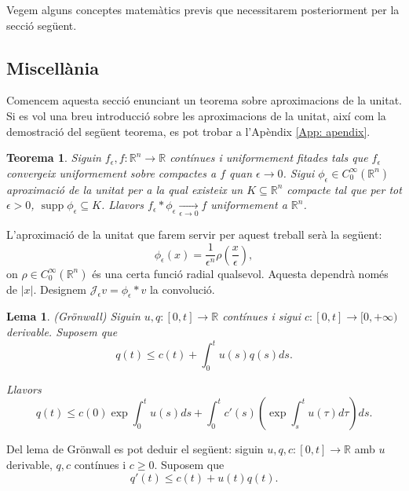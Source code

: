 \documentclass{article}
\numberwithin{equation}{section}
\DeclareMathOperator{\supp}{supp}
\newtheorem{teorema}{Teorema}[section]
\newtheorem{lema}{Lema}[section]
\begin{document}
Vegem alguns conceptes matem\`{a}tics previs que necessitarem posteriorment per la secci\'{o} seg\"{u}ent.

\subsection{Miscel\textperiodcentered l\`{a}nia}\label{Sse: miscellania}

Comencem aquesta secci\'{o} enunciant un teorema sobre aproximacions de la unitat. Si es vol una breu introducci\'{o} sobre les aproximacions de la unitat, aix\'{i} com la demostraci\'{o} del seg\"{u}ent teorema, es pot trobar a l'Ap\`{e}ndix \ref{App: apendix}.

\begin{teorema}\label{Teo: successio suavitzada}
Siguin $f_{\epsilon},f:\mathbb{R}^n\rightarrow\mathbb{R}$ cont\'{i}nues i uniformement fitades tals que $f_{\epsilon}$ convergeix uniformement sobre compactes a $f$ quan $\epsilon\to0$. Sigui $\phi_{\epsilon}\in C_0^{\infty}(\mathbb{R}^n)$ aproximaci\'{o} de la unitat per a la qual existeix un $K\subseteq\mathbb{R}^n$ compacte tal que per tot $\epsilon>0$, $\supp\phi_{\epsilon}\subseteq K$. Llavors $f_{\epsilon}*\phi_{\epsilon}\xrightarrow[\epsilon\to0]{}f$ uniformement a $\mathbb{R}^n$.
\end{teorema}

L'aproximaci\'{o} de la unitat que farem servir per aquest treball ser\`{a} la seg\"{u}ent:
\begin{equation}\label{Equ. aproximacio unitat}
\phi_{\epsilon}(x)=\frac{1}{\epsilon^n}\rho\left(\frac{x}{\epsilon}\right),
\end{equation}
on $\rho\in C_0^{\infty}(\mathbb{R}^n)$ \'{e}s una certa funci\'{o} radial qualsevol. Aquesta dependr\`{a} nom\'{e}s de $|x|$. Designem $\mathcal{J}_{\epsilon}v=\phi_{\epsilon}*v$ la convoluci\'{o}.

\begin{lema}\label{Lem: Gronwall}
(Gr\"{o}nwall) Siguin $u,q:[0,t]\rightarrow\mathbb{R}$ cont\'{i}nues i sigui $c:[0,t]\rightarrow[0,+\infty)$ derivable. Suposem que
\[q(t)\leq c(t)+\int_0^tu(s)q(s)ds.\]

Llavors
\[q(t)\leq c(0)\exp\int_0^tu(s)ds+\int_0^tc'(s)\left(\exp\int_s^tu(\tau)d\tau\right)ds.\]
\end{lema}

Del lema de Gr\"{o}nwall es pot deduir el seg\"{u}ent: siguin $u,q,c:[0,t]\rightarrow\mathbb{R}$ amb $u$ derivable, $q,c$ cont\'{i}nues i $c\geq0$. Suposem que
\[q'(t)\leq c(t)+u(t)q(t).\]
\end{document}
